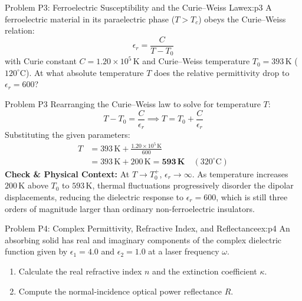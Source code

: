 \documentclass[11pt,a4paper]{article}
\begin{document}
\newpage

\begin{examplebox}{Problem P3: Ferroelectric Susceptibility and the Curie--Weiss Law}{ex:p3}
A ferroelectric material in its paraelectric phase ($T > T_c$) obeys the Curie--Weiss relation:
\begin{equation}
    \epsilon_r = \frac{C}{T - T_0}
\end{equation}
with Curie constant $C = 1.20 \times 10^5\,\text{K}$ and Curie--Weiss temperature $T_0 = 393\,\text{K}$ ($120^\circ\text{C}$). At what absolute temperature $T$ does the relative permittivity drop to $\epsilon_r = 600$?
\end{examplebox}

\begin{solbox}{Problem P3}
Rearranging the Curie--Weiss law to solve for temperature $T$:
\begin{equation}
    T - T_0 = \frac{C}{\epsilon_r} \implies T = T_0 + \frac{C}{\epsilon_r}
\end{equation}
Substituting the given parameters:
\begin{align}
    T &= 393\,\text{K} + \frac{1.20 \times 10^5\,\text{K}}{600} \\
      &= 393\,\text{K} + 200\,\text{K} = \mathbf{593\,\text{K}} \quad (320^\circ\text{C})
\end{align}
\textbf{Check \& Physical Context:}
At $T \to T_0^+$, $\epsilon_r \to \infty$. As temperature increases $200\,\text{K}$ above $T_0$ to $593\,\text{K}$, thermal fluctuations progressively disorder the dipolar displacements, reducing the dielectric response to $\epsilon_r = 600$, which is still three orders of magnitude larger than ordinary non-ferroelectric insulators.
\end{solbox}

\vspace{0.4cm}

\begin{examplebox}{Problem P4: Complex Permittivity, Refractive Index, and Reflectance}{ex:p4}
An absorbing solid has real and imaginary components of the complex dielectric function given by $\epsilon_1 = 4.0$ and $\epsilon_2 = 1.0$ at a laser frequency $\omega$.
\begin{enumerate}[label=(\alph*), leftmargin=*]
    \item Calculate the real refractive index $n$ and the extinction coefficient $\kappa$.
    \item Compute the normal-incidence optical power reflectance $R$.
\end{enumerate}
\end{examplebox}
\end{document}
